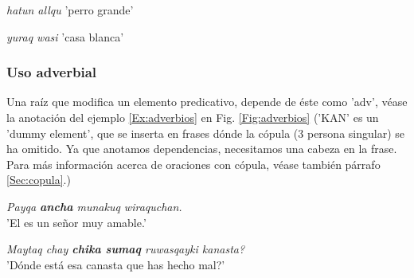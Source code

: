 \documentclass[a4paper,11pt,DIV12]{scrartcl}
\begin{document}
\begin{center}
 \begin{minipage}{0.4\textwidth}
 \begin{examples}
 \item {\em hatun allqu}
      'perro grande'
  \item {\em yuraq wasi}
      'casa blanca'
\end{examples}
\end{minipage}
\hfill
\begin{minipage}{0.5\textwidth}
\begin{center}
\end{center}
\end{minipage}
\end{center}


\subsubsection{Uso adverbial}\label{Sec:adverbios}

Una ra\'iz que modifica un elemento predicativo, depende de \'este como 'adv', v\'ease la anotaci\'on del ejemplo \ref{Ex:adverbios} en Fig. \ref{Fig:adverbios} ('KAN' es un 'dummy element', que se inserta en frases d\'onde la c\'opula (3{\textordfeminine} persona singular) se ha omitido. Ya que anotamos dependencias, necesitamos una cabeza en la frase. Para m\'as informaci\'on acerca de oraciones con c\'opula, v\'ease tambi\'en p\'arrafo \ref{Sec:copula}.) 

\begin{examples}
 \item\label{Ex:adverbios} {\em Payqa \textbf{ancha} munakuq wiraquchan.}\\
      'El es un se\~nor muy amable.'
 \item {\em Maytaq chay \textbf{chika sumaq} ruwasqayki kanasta?}\\
	'{\textquestiondown}D\'onde est\'a esa canasta que has hecho mal?'
 \hfill {\small \citep[116]{Cusi2}}
\end{examples}
\end{document}
